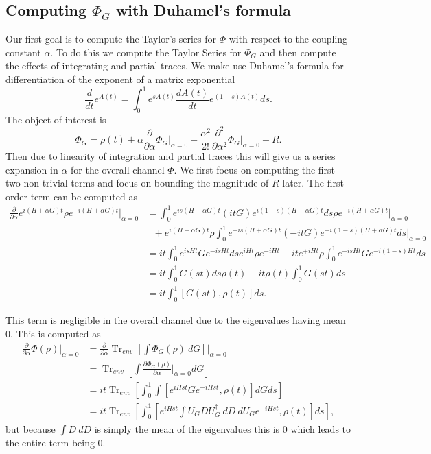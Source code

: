 \documentclass{article}
\newcommand{\brackets}[1]{\left[ #1 \right]}
\DeclareMathOperator{\Tr}{Tr}
\newcommand{\partrace}[2]{\Tr_{#1} \brackets{ #2 }}
\begin{document}
\subsection{Computing $\Phi_G$ with Duhamel's formula}
Our first goal is to compute the Taylor's series for $\Phi$ with respect to the coupling constant $\alpha$. To do this we compute the Taylor Series for $\Phi_G$ and then compute the effects of integrating and partial traces. We make use Duhamel's formula for differentiation of the exponent of a matrix exponential
\begin{equation}
    \frac{d}{dt} e^{A(t)} = \int_0^1 e^{s A(t)} \frac{d A(t)}{dt} e^{(1-s)A(t)} ds.
\end{equation}
The object of interest is $$\Phi_G = \rho(t) + \alpha \frac{\partial}{\partial \alpha} \Phi_G \big|_{\alpha=0} + \frac{\alpha^2}{2!} \frac{\partial^2}{\partial \alpha^2} \Phi_G \big|_{\alpha=0} + R.$$ Then due to linearity of integration and partial traces this will give us a series expansion in $\alpha$ for the overall channel $\Phi$. We first focus on computing the first two non-trivial terms and focus on bounding the magnitude of $R$ later. 
The first order term can be computed as
\begin{align}
    \frac{\partial}{\partial \alpha} e^{i(H+\alpha G)t} \rho e^{-i (H+\alpha G)t} \bigg|_{\alpha = 0} &= \int_{0}^{1} e^{i s (H+\alpha G)t} (i t G) e^{i (1-s) (H+\alpha G)t} ds \rho e^{-i(H+\alpha G)t} \bigg|_{\alpha=0} \nonumber \\
    &\text{ } + e^{i(H+\alpha G)t} \rho \int_{0}^1 e^{-i s (H+\alpha G) t} (- i t G) e^{-i (1-s) (H+\alpha G)t} ds \bigg|_{\alpha = 0} \label{eq:first_order_alpha_derivative}\\
    &= i t \int_0^1 e^{i s H t} G e^{-i s H t} ds e^{i H t} \rho e^{-i H t} - i t e^{+i H t} \rho \int_0^1 e^{-is H t} G e^{-i(1-s) Ht} ds \\
    &= i t \int_0^1 G(s t) ds \rho(t) - it \rho(t) \int_0^1 G(s t) ds \\
    &= i t \int_0^1 [G(s t), \rho(t)] ds.
\end{align}

This term is negligible in the overall channel due to the eigenvalues having mean 0. This is computed as
\begin{align}
    \frac{\partial}{\partial \alpha} \Phi(\rho) \bigg|_{\alpha = 0} &= \frac{\partial}{\partial \alpha} \partrace{env}{\int \Phi_G(\rho) ~dG} \bigg|_{\alpha=0} \\
    &= \partrace{env}{\int\frac{\partial \Phi_G(\rho)}{\partial \alpha} \bigg|_{\alpha=0} dG } \\
    &= i t \partrace{env}{\int_0^1 \int [e^{i H s t} G e^{-i H s t}, \rho(t)] dG ds} \\
    &= i t \partrace{env}{\int_0^1  [e^{i H s t} \int U_G D U_G^\dagger ~ dD ~ dU_G e^{-i H s t}, \rho(t)] ds},
\end{align}
but because $\int D ~dD$ is simply the mean of the eigenvalues this is 0 which leads to the entire term being 0. 
\end{document}
